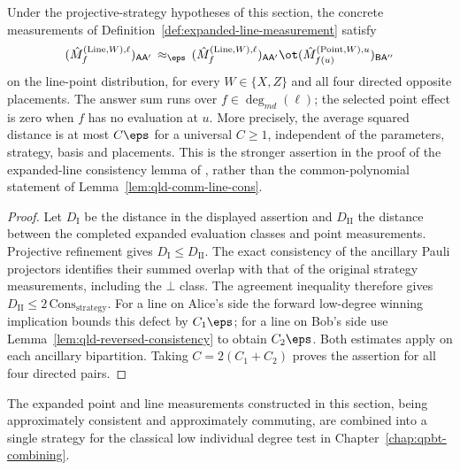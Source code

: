 \begin{lemma}
	\label{lem:expanded-line-point-linear-error}
	\leanok
	Under the projective-strategy hypotheses of this section, the concrete
	measurements of Definition~\ref{def:expanded-line-measurement} satisfy
	\begin{equation}
		\label{eq:qld-comm-line-pt-cons-eps}
		(\hat{M}^{(\mathrm{Line},W),\ell}_f)_{\mathsf{A}\mathsf{A}'}
		\,\approx_{\eps}\,
		(\hat{M}^{(\mathrm{Line},W),\ell}_f)_{\mathsf{A}\mathsf{A}'}
		\ot (\hat{M}^{(\mathrm{Point},W),u}_{f(u)})_{\mathsf{B}\mathsf{A}''}
	\end{equation}
	on the line-point distribution, for every $W\in\{X,Z\}$ and all four
	directed opposite placements. The answer sum runs over
	$f\in\deg_{md}(\ell)$; the selected point effect is zero when $f$ has
	no evaluation at $u$. More precisely, the average squared distance is at
	most $C\eps$ for a universal $C\geq1$, independent of the parameters,
	strategy, basis and placements. This is the stronger assertion in the
	proof of the expanded-line consistency lemma of \cite{Ji2020MIPStar},
	rather than the common-polynomial statement of
	Lemma~\ref{lem:qld-comm-line-cons}.
\end{lemma}
\begin{proof}
	\leanok
	Let $D_{\mathrm I}$ be the distance in the displayed assertion and
	$D_{\mathrm{II}}$ the distance between the completed expanded
	evaluation classes and point measurements. Projective refinement gives
	$D_{\mathrm I}\leq D_{\mathrm{II}}$. The exact consistency of the
	ancillary Pauli projectors identifies their summed overlap with that
	of the original strategy measurements, including the $\bot$ class.
	The agreement inequality therefore gives
	$D_{\mathrm{II}}\leq 2\,\mathrm{Cons}_{\mathrm{strategy}}$.
	For a line on Alice's side the forward low-degree winning implication
	bounds this defect by $C_1\eps$; for a line on Bob's side use
	Lemma~\ref{lem:qld-reversed-consistency} to obtain $C_2\eps$.
	Both estimates apply on each ancillary bipartition. Taking
	$C=2(C_1+C_2)$ proves the assertion for all four directed pairs.
\end{proof}

The expanded point and line measurements constructed in this section, being
approximately consistent and approximately commuting, are combined into a
single strategy for the classical low individual degree test in
Chapter~\ref{chap:qpbt-combining}.
